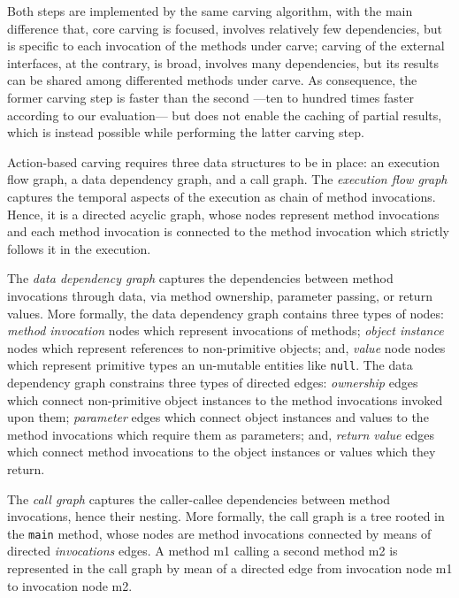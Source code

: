 \documentclass[10pt,conference]{IEEEtran}
\begin{document}
Both steps are implemented by the same carving algorithm, with the main difference that, 
core carving is focused, involves relatively few dependencies, 
but is specific to each invocation of the methods under carve; 
carving of the external interfaces, at the contrary, is broad, 
involves many dependencies, but its results can be shared among
differented methods under carve. 
As consequence, the former carving step is faster than the second ---ten
 to hundred times faster according to our evaluation--- but does not enable
 the caching of partial results, which is instead possible while performing the latter carving step.

Action-based carving requires three data structures to be in place:
an execution flow graph, a data dependency graph, and a call graph.
%
The \emph{execution flow graph} captures the temporal aspects of the execution as chain of method invocations.
Hence, it is a directed acyclic graph, whose nodes represent method invocations and each method invocation is connected to the method invocation which strictly follows it in the execution.

The \emph{data dependency graph} captures the dependencies between method invocations through data, via method ownership, parameter passing, or return values.
%
More formally, the data dependency graph contains three types of nodes:
	\emph{method invocation} nodes which represent invocations of methods;
	\emph{object instance} nodes which represent references to non-primitive objects;
	and, \emph{value} node nodes which represent primitive types an un-mutable entities like \texttt{null}.
The data dependency graph constrains three types of directed edges:
	\emph{ownership} edges which connect non-primitive object instances to the method invocations invoked upon them;
	\emph{parameter} edges which connect object instances and values to the method invocations which require them as parameters;
	and, \emph{return value} edges which connect method invocations to the object instances or values which they return. 

The \emph{call graph} captures the caller-callee dependencies between method invocations, hence their nesting.
More formally, the call graph is a tree rooted in the \texttt{main} method, whose nodes are method invocations connected by means of directed \emph{invocations} edges. A method m1 calling a second method m2 is represented in the call graph by mean of a directed edge from invocation node m1 to invocation node m2.
\end{document}
